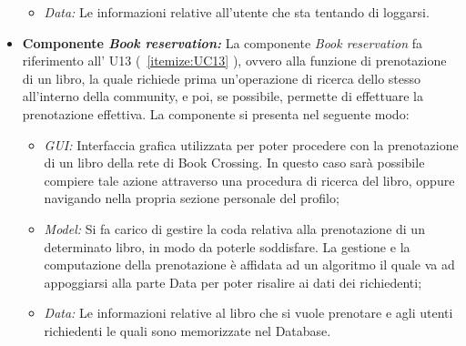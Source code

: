 \begin{itemize}
\begin{itemize}
		\item \textit{Data:} Le informazioni relative all'utente che sta tentando di loggarsi.
	\end{itemize}
	\item \textbf{Componente \textit{Book reservation:}}  La componente \textit{Book reservation} fa riferimento all’ U13 (~\ref{itemize:UC13} ), ovvero alla funzione di prenotazione di un libro, la quale richiede prima un'operazione di ricerca dello stesso all'interno della community, e poi, se possibile, permette di effettuare la prenotazione  effettiva. La componente si presenta nel seguente modo:
	\begin{itemize}
		\item \textit{GUI:} Interfaccia grafica utilizzata per poter procedere con la prenotazione di un libro della rete di Book Crossing. In questo caso sarà possibile compiere tale azione attraverso una procedura di ricerca del libro, oppure navigando nella propria sezione personale del profilo;
		\item \textit{Model:} Si fa carico di gestire la coda relativa alla prenotazione di un determinato libro, in modo da poterle soddisfare. La gestione e la computazione della prenotazione è affidata ad un algoritmo il quale va ad appoggiarsi alla parte Data per poter risalire ai dati dei richiedenti;
		\item \textit{Data:} Le informazioni relative al libro che si vuole prenotare e agli utenti richiedenti le quali sono memorizzate nel Database.
	\end{itemize}
\end{itemize}